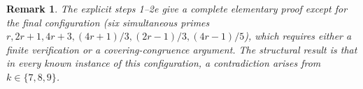 \documentclass[11pt]{article}
\newtheorem{remark}{Remark}
\begin{document}
\begin{remark}
The explicit steps 1--2e give a complete elementary proof except for the final
configuration (six simultaneous primes $r, 2r+1, 4r+3, (4r+1)/3, (2r-1)/3,
(4r-1)/5$), which requires either a finite verification or a covering-congruence
argument.  The structural result is that in every known instance of this
configuration, a contradiction arises from $k \in \{7, 8, 9\}$.
\end{remark}
\end{document}

